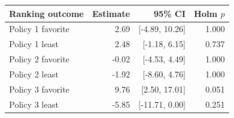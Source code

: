 \begin{tabular}{@{}lrrr@{}}
\toprule
Ranking outcome & Estimate & 95\% CI & Holm $p$ \\
\midrule
Policy 1 favorite & 2.69 & [-4.89, 10.26] & 1.000 \\
Policy 1 least & 2.48 & [-1.18, 6.15] & 0.737 \\
Policy 2 favorite & -0.02 & [-4.53, 4.49] & 1.000 \\
Policy 2 least & -1.92 & [-8.60, 4.76] & 1.000 \\
Policy 3 favorite & 9.76 & [2.50, 17.01] & 0.051 \\
Policy 3 least & -5.85 & [-11.71, 0.00] & 0.251 \\
\bottomrule
\end{tabular}
